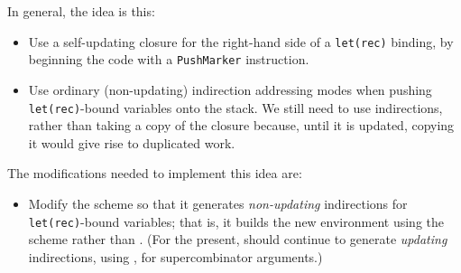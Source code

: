 In general, the idea is this:
\begin{itemize}
\item
Use a self-updating closure for the right-hand side of a \mbox{\tt let(rec)} binding,
by beginning the code with a \mbox{\tt PushMarker} instruction.
\item
Use ordinary (non-updating) indirection addressing modes when pushing
\mbox{\tt let(rec)}-bound variables onto the stack.
We still need to use indirections, rather than taking a copy of the
closure because, until it is updated, copying it would give rise to
duplicated work.
\end{itemize}
The modifications needed to implement this idea are:
\begin{itemize}
\item
Modify the \tR{} scheme so that it generates {\em non-updating\/} indirections
for
\mbox{\tt let(rec)}-bound variables; that is, it builds the new environment
using the \tI{} scheme rather than \tJ{}.
(For the present, \tSC{} should continue to generate
{\em updating\/} indirections, using \tJ{}, for supercombinator arguments.)


\end{itemize}
